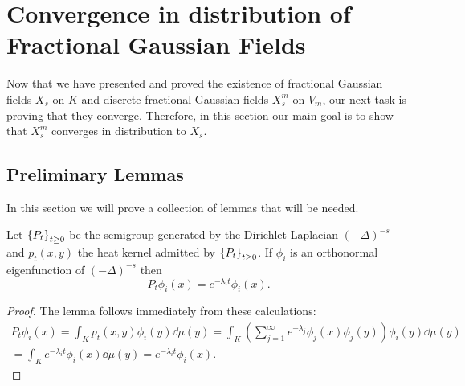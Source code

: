 \setlength\beforechapskip{-1em}
\chapter{Convergence in distribution of Fractional Gaussian Fields}

Now that we have presented and proved the existence of fractional Gaussian fields $X_s$ on $K$ and discrete fractional Gaussian fields $X_s^{m}$ on $V_m$, our next task is proving that they converge. Therefore, in this section our main goal is to show that $X_s^{m}$ converges in distribution to $X_s$.

\section{Preliminary Lemmas}
In this section we will prove a collection of lemmas that will be needed.

\begin{lemma}\label{suckItKigami}
	Let $\cbr{P_t}_{t \geq 0}$ be the semigroup generated by the Dirichlet Laplacian $(-\Delta)^{-s}$ and $p_t(x,y)$ the heat kernel admitted by $\cbr{P_t}_{t \geq 0}$. If $\phi_i$ is an orthonormal eigenfunction of $(-\Delta)^{-s}$ then
	\begin{equation}
		P_t \phi_i(x) = e^{-\lambda_i t}\phi_i(x).
	\end{equation}
\end{lemma}
\begin{proof}
	 The lemma follows immediately from these calculations:
	\begin{multline}
		P_t \phi_i(x) = \int_{K}p_t(x,y)\phi_i(y) \dd \mu(y) = \int_{K} \left(\sum_{j = 1}^{\infty}e^{-\lambda_j} \phi_j(x)\phi_j(y)\right) \phi_i(y) \dd \mu(y) \\
		= \int_{K} e^{-\lambda_i t}\phi_i(x) \dd \mu(y) = e^{-\lambda_i t}\phi_i(x).
	\end{multline}
\end{proof}


